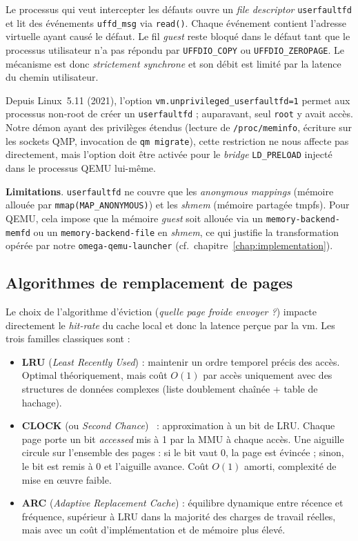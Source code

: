 Le processus qui veut intercepter les défauts ouvre un \emph{file descriptor} \texttt{userfaultfd} et lit des événements \texttt{uffd\_msg} via \texttt{read()}. Chaque événement contient l'adresse virtuelle ayant causé le défaut. Le fil \emph{guest} reste bloqué dans le défaut tant que le processus utilisateur n'a pas répondu par \texttt{UFFDIO\_COPY} ou \texttt{UFFDIO\_ZEROPAGE}. Le mécanisme est donc \emph{strictement synchrone} et son débit est limité par la latence du chemin utilisateur.

Depuis Linux~5.11 (2021), l'option \texttt{vm.unprivileged\_userfaultfd=1} permet aux processus non-root de créer un \texttt{userfaultfd} ; auparavant, seul \texttt{root} y avait accès. Notre démon ayant des privilèges étendus (lecture de \texttt{/proc/meminfo}, écriture sur les sockets QMP, invocation de \texttt{qm migrate}), cette restriction ne nous affecte pas directement, mais l'option doit être activée pour le \emph{bridge} \texttt{LD\_PRELOAD} injecté dans le processus QEMU lui-même.

\textbf{Limitations}. \texttt{userfaultfd} ne couvre que les \emph{anonymous mappings} (mémoire allouée par \texttt{mmap(MAP\_ANONYMOUS)}) et les \emph{shmem} (mémoire partagée tmpfs). Pour QEMU, cela impose que la mémoire \emph{guest} soit allouée via un \texttt{memory-backend-memfd} ou un \texttt{memory-backend-file} en \emph{shmem}, ce qui justifie la transformation opérée par notre \texttt{omega-qemu-launcher} (cf.~chapitre~\ref{chap:implementation}).

\subsection{Algorithmes de remplacement de pages}

Le choix de l'algorithme d'éviction (\emph{quelle page froide envoyer ?}) impacte directement le \emph{hit-rate} du cache local et donc la latence perçue par la \acrshort{vm}. Les trois familles classiques sont :

\begin{itemize}[leftmargin=*]
    \item \textbf{LRU} (\emph{Least Recently Used}) : maintenir un ordre temporel précis des accès. Optimal théoriquement, mais coût $O(1)$ par accès uniquement avec des structures de données complexes (liste doublement chaînée + table de hachage).
    \item \textbf{CLOCK} (ou \emph{Second Chance})~\cite{jiang_2005_clockpro} : approximation à un bit de LRU. Chaque page porte un bit \emph{accessed} mis à 1 par la MMU à chaque accès. Une aiguille circule sur l'ensemble des pages : si le bit vaut 0, la page est évincée ; sinon, le bit est remis à 0 et l'aiguille avance. Coût $O(1)$ amorti, complexité de mise en œuvre faible.
    \item \textbf{ARC} (\emph{Adaptive Replacement Cache}) : équilibre dynamique entre récence et fréquence, supérieur à LRU dans la majorité des charges de travail réelles, mais avec un coût d'implémentation et de mémoire plus élevé.
\end{itemize}

